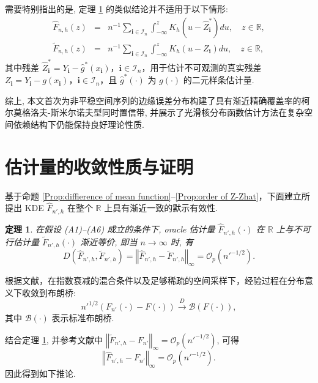 \documentclass[a4paper,openay,14pt]{ctexbook}
\newtheorem{thm}{定理}[section]
\numberwithin{equation}{section}
\numberwithin{lem}{section}
\begin{document}
需要特别指出的是, 定理 \ref{THM:FhatFtilde} 的类似结论并不适用于以下情形:
\begin{eqnarray*}
\hat{F}_{n,h}\left( z \right)
&=& n^{-1} \sum_{\mathbf{i} \in \mathcal{I}_n} \int_{-\infty}^{z}
K_h\left( u - \hat{Z}_{\mathbf{i}}^{\ast} \right) du, \quad z \in \mathbb{R}, \\
\tilde{F}_{n,h}\left( z \right)
&=& n^{-1} \sum_{\mathbf{i} \in \mathcal{I}_n} \int_{-\infty}^{z}
K_h\left( u - Z_{\mathbf{i}} \right) du, \quad z \in \mathbb{R},
\end{eqnarray*}
其中残差 $\hat{Z}_{\mathbf{i}}^{\ast} = Y_{\mathbf{i}} - \hat{g}^{\ast}(x_{\mathbf{i}})$，$\mathbf{i} \in \mathcal{I}_n$，用于估计不可观测的真实残差 $Z_{\mathbf{i}} = Y_{\mathbf{i}} - g(x_{\mathbf{i}})$，$\mathbf{i} \in \mathcal{I}_n$，且 $\hat{g}^{\ast}(\cdot)$ 为 $g(\cdot)$ 的二元样条估计量.

综上, 本文首次为非平稳空间序列的边缘误差分布构建了具有渐近精确覆盖率的柯尔莫格洛夫-斯米尔诺夫型同时置信带, 并展示了光滑核分布函数估计方法在复杂空间依赖结构下仍能保持良好理论性质.

\section{估计量的收敛性质与证明}

基于命题 \ref{Prop:diffierence of mean function}–\ref{Prop:order of Z-Zhat}，下面建立所提出 KDE $\hat{F}_{n',h}$ 在整个 $\mathbb{R}$ 上具有渐近一致的默示有效性.
\begin{thm} \label{THM:FhatFtilde}
在假设 (A1)–(A6) 成立的条件下, oracle 估计量 $\hat{F}_{n',h}(\cdot)$ 在 $\mathbb{R}$ 上与不可行估计量 $\tilde{F}_{n',h}(\cdot)$ 渐近等价, 即当 $n \to \infty$ 时, 有
\[
D\left(\hat{F}_{n',h}, \tilde{F}_{n',h}\right)
= \left\Vert \hat{F}_{n',h} - \tilde{F}_{n',h} \right\Vert_{\infty}
= {\scriptstyle{\mathcal{O}}}_p\left(n'^{-1/2}\right).
\]
\end{thm}

根据文献\cite{fazekas2003limit}，在指数衰减的混合条件以及足够稀疏的空间采样下，经验过程在分布意义下收敛到布朗桥:
\[
n'^{1/2}\left(F_{n'}(\cdot) - F(\cdot)\right)
\overset{D}{\rightarrow} \mathcal{B}(F(\cdot)),
\]
其中 $\mathcal{B}(\cdot)$ 表示标准布朗桥.

结合定理 \ref{THM:FhatFtilde}, 并参考文献\cite{wang2013smooth}中
$\left\Vert \tilde{F}_{n',h} - F_{n'} \right\Vert_{\infty}
= {\scriptstyle{\mathcal{O}}}_p\left(n'^{-1/2}\right)$,
可得
\[
\left\Vert \hat{F}_{n',h} - F_{n'} \right\Vert_{\infty}
= {\scriptstyle{\mathcal{O}}}_p\left(n'^{-1/2}\right).
\]
因此得到如下推论.
\end{document}
